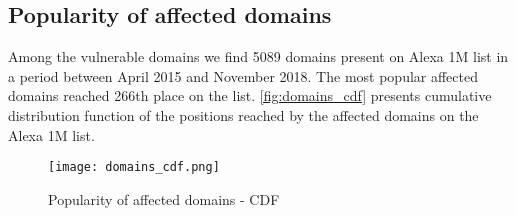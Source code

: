 \subsection{Popularity of affected domains}

Among the vulnerable domains we find 5089 domains present on Alexa 1M list in a period between April 2015 and November 2018. The most popular affected domains reached 266th place on the list. \autoref{fig:domains_cdf} presents cumulative distribution function of the positions reached  by the affected domains on the Alexa 1M list. 


\begin{figure}[!hbt]
\centering
\texttt{[image: domains\_cdf.png]}
\caption{Popularity of affected domains - CDF}
\label{fig:domains_cdf}
\end{figure}

